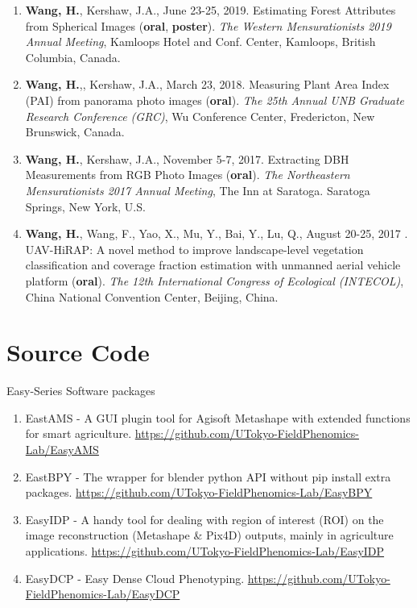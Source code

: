 \begin{singlespace}
\begin{enumerate}
  \item \textbf{Wang, H.}, Kershaw, J.A., June 23-25, 2019. Estimating Forest Attributes from Spherical Images (\textbf{oral}, \textbf{poster}). \textit{The Western Mensurationists 2019 Annual Meeting}, Kamloops Hotel and Conf. Center, Kamloops, British Columbia, Canada.
  \item \textbf{Wang, H.},, Kershaw, J.A., March 23, 2018. Measuring Plant Area Index (PAI) from panorama photo images (\textbf{oral}). \textit{The 25th Annual UNB Graduate Research Conference (GRC)}, Wu Conference Center, Fredericton, New Brunswick, Canada.
  \item \textbf{Wang, H.}, Kershaw, J.A., November 5-7, 2017. Extracting DBH Measurements from RGB Photo Images (\textbf{oral}). \textit{The Northeastern Mensurationists 2017 Annual Meeting}, The Inn at Saratoga. Saratoga Springs, New York, U.S.
  \item \textbf{Wang, H.}, Wang, F., Yao, X., Mu, Y., Bai, Y., Lu, Q., August 20-25, 2017 . UAV-HiRAP: A novel method to improve landscape-level vegetation classification and coverage fraction estimation with unmanned aerial vehicle platform (\textbf{oral}). \textit{The 12th International Congress of Ecological (INTECOL)}, China National Convention Center, Beijing, China.
\end{enumerate}

\section*{Source Code}

\noindent
Easy-Series Software packages

\begin{enumerate}
  \item EastAMS - A GUI plugin tool for Agisoft Metashape with extended functions for smart agriculture. \url{https://github.com/UTokyo-FieldPhenomics-Lab/EasyAMS}
  \item EastBPY - The wrapper for blender python API without pip install extra packages. \url{https://github.com/UTokyo-FieldPhenomics-Lab/EasyBPY}
  \item EasyIDP - A handy tool for dealing with region of interest (ROI) on the image reconstruction (Metashape \& Pix4D) outputs, mainly in agriculture applications. \url{https://github.com/UTokyo-FieldPhenomics-Lab/EasyIDP}
  \item  EasyDCP - Easy Dense Cloud Phenotyping. \url{https://github.com/UTokyo-FieldPhenomics-Lab/EasyDCP}
\end{enumerate}


\end{singlespace}
